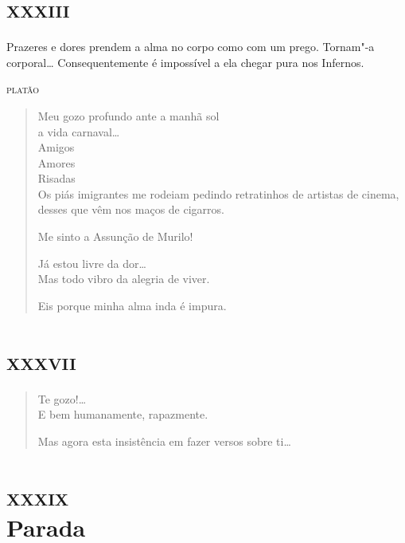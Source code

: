 \chapter[«Meu gozo profundo ante a manhã sol»]{\textsc{xxxiii}}

\epigraph{Prazeres e dores prendem a alma no corpo como com um prego. Tornam"-a
corporal\ldots{} Consequentemente é impossível a ela chegar pura nos
Infernos.}{\textsc{platão}}

\begin{verse}
Meu gozo profundo ante a manhã sol\\
\qquad\qquad\qquad\qquad{}a vida carnaval\ldots{}\\
\qquad\qquad\qquad\qquad{}Amigos\\
\qquad\qquad\qquad{}Amores\\
\qquad\qquad{}Risadas\\
Os piás imigrantes me rodeiam pedindo retratinhos de artistas de cinema,
desses que vêm nos maços de cigarros.

Me sinto a Assunção de Murilo!

Já estou livre da dor\ldots{}\\
Mas todo vibro da alegria de viver.

\quad{}Eis porque minha alma inda é impura.
\end{verse}

\chapter[«Te gozo!\ldots{}»]{\textsc{xxxvii}}

\begin{verse}
Te gozo!\ldots{}\\
E bem humanamente, rapazmente.

Mas agora esta insistência em fazer versos sobre ti\ldots{}
\end{verse}

\chapter[Parada]{\textsc{xxxix}\\Parada {}}

